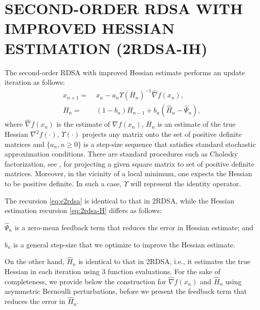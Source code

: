 \documentclass[letterpaper, 10 pt, conference]{ieeeconf}  %
\begin{document}
\section{SECOND-ORDER RDSA WITH IMPROVED HESSIAN ESTIMATION (2RDSA-IH)}
\label{sec:2rdsa-ih}
The second-order RDSA with improved Hessian estimate performs an update iteration as follows:
\begin{align}
\label{eq:e2rdsa}
x_{n+1} = & \; x_n - a_n \Upsilon(\overline H_n)^{-1}\widehat\nabla f(x_n), \\
\overline H_n = & \; (1-b_{n})  \overline H_{n-1} + b_{n} ( \widehat H_n - \widehat \Psi_n),\label{eq:2rdsa-H}
\end{align}
where $\widehat\nabla f(x_n)$ is the estimate of $\nabla f(x_n)$, 
$\overline H_n$ is an estimate of the true Hessian ${\nabla}^2 f(\cdot)$, $\Upsilon(\cdot)$ projects any matrix onto the set of positive definite matrices and $\{a_n, n\ge 0\}$ is a step-size sequence that satisfies standard stochastic approximation conditions. There are standard procedures such as Cholesky factorization, see \cite{bert22}, for projecting a given square matrix to set of positive definite matrices. Moreover, in the vicinity of a local minimum, one expects the Hessian to be positive definite. In such a case, $\Upsilon$ will represent the identity operator.

The recursion \eqref{eq:e2rdsa} is identical to that in 2RDSA, while the Hessian estimation recursion \eqref{eq:2rdsa-H} differs as follows:\\
\begin{inparaenum}[\bfseries (i)]
\item  $\widehat \Psi_n$ is a zero-mean feedback term that reduces the error in Hessian estimate; and\\
\item $b_n$ is a general step-size that we optimize to improve the Hessian estimate.
\end{inparaenum}

On the other hand, $\widehat H_n$ is identical to that in 2RDSA, i.e., it estimates the true Hessian in each iteration using $3$ function evaluations. %
For the sake of completeness, we provide below the construction for $\widehat\nabla f(x_n)$ and $\widehat H_n$ using asymmetric Bernoulli perturbations, before we present the feedback term that reduces the error in $\widehat H_n$.
\end{document}
